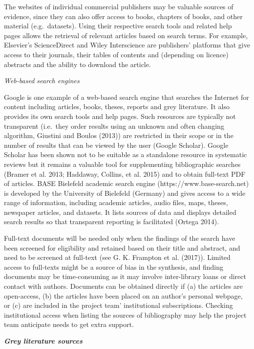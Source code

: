 \documentclass[
  letterpaper,
  DIV=11,
  numbers=noendperiod]{scrreprt}
\begin{document}
The websites of individual commercial publishers may be valuable sources
of evidence, since they can also offer access to books, chapters of
books, and other material (e.g.~datasets). Using their respective search
tools and related help pages allows the retrieval of relevant articles
based on search terms. For example, Elsevier's ScienceDirect and Wiley
Interscience are publishers' platforms that give access to their
journals, their tables of contents and (depending on licence) abstracts
and the ability to download the article.

\emph{Web-based search engines}

Google is one example of a web-based search engine that searches the
Internet for content including articles, books, theses, reports and grey
literature. It also provides its own search tools and help pages. Such
resources are typically not transparent (i.e.~they order results using
an unknown and often changing algorithm, Giustini and Boulos (2013)) are
restricted in their scope or in the number of results that can be viewed
by the user (Google Scholar). Google Scholar has been shown not to be
suitable as a standalone resource in systematic reviews but it remains a
valuable tool for supplementing bibliographic searches (Bramer et al.
2013; Haddaway, Collins, et al. 2015) and to obtain full-text PDF of
articles. BASE Bielefeld academic search engine
(https://www.base-search.net) is developed by the University of
Bielefeld (Germany) and gives access to a wide range of information,
including academic articles, audio files, maps, theses, newspaper
articles, and datasets. It lists sources of data and displays detailed
search results so that transparent reporting is facilitated (Ortega
2014).

Full-text documents will be needed only when the findings of the search
have been screened for eligibility and retained based on their title and
abstract, and need to be screened at full-text (see G. K. Frampton et
al. (2017)). Limited access to full-texts might be a source of bias in
the synthesis, and finding documents may be time-consuming as it may
involve inter-library loans or direct contact with authors. Documents
can be obtained directly if (a) the articles are open-access, (b) the
articles have been placed on an author's personal webpage, or (c) are
included in the project team' institutional subscriptions. Checking
institutional access when listing the sources of bibliography may help
the project team anticipate needs to get extra support.

\textbf{\emph{Grey literature sources}}
\end{document}
